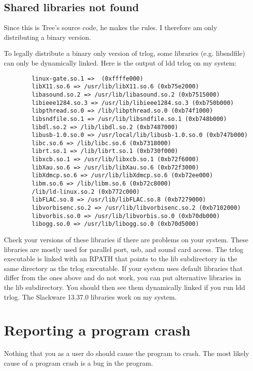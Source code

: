 \documentclass[12pt]{article}
\begin{document}
\subsection{Shared libraries not found}
Since this is Tree's source code, he makes the rules.
I therefore am only distributing a binary version.

To legally distribute a binary only version of trlog, some libraries
(e.g. libsndfile) can only be dynamically linked. Here is the output
of ldd trlog on my system:
\begin{verbatim}
        linux-gate.so.1 =>  (0xffffe000)
        libX11.so.6 => /usr/lib/libX11.so.6 (0xb75e2000)
        libasound.so.2 => /usr/lib/libasound.so.2 (0xb7515000)
        libieee1284.so.3 => /usr/lib/libieee1284.so.3 (0xb750b000)
        libpthread.so.0 => /lib/libpthread.so.0 (0xb74f1000)
        libsndfile.so.1 => /usr/lib/libsndfile.so.1 (0xb748b000)
        libdl.so.2 => /lib/libdl.so.2 (0xb7487000)
        libusb-1.0.so.0 => /usr/local/lib/libusb-1.0.so.0 (0xb747b000)
        libc.so.6 => /lib/libc.so.6 (0xb7318000)
        librt.so.1 => /lib/librt.so.1 (0xb730f000)
        libxcb.so.1 => /usr/lib/libxcb.so.1 (0xb72f6000)
        libXau.so.6 => /usr/lib/libXau.so.6 (0xb72f3000)
        libXdmcp.so.6 => /usr/lib/libXdmcp.so.6 (0xb72ee000)
        libm.so.6 => /lib/libm.so.6 (0xb72c8000)
        /lib/ld-linux.so.2 (0xb772c000)
        libFLAC.so.8 => /usr/lib/libFLAC.so.8 (0xb7279000)
        libvorbisenc.so.2 => /usr/lib/libvorbisenc.so.2 (0xb7102000)
        libvorbis.so.0 => /usr/lib/libvorbis.so.0 (0xb70db000)
        libogg.so.0 => /usr/lib/libogg.so.0 (0xb70d5000)
\end{verbatim}
Check your versions of these libraries if there are problems on your
system. These libraries are mostly
used for parallel port, usb, and sound card access.
The trlog executable is linked with an RPATH that points
to the lib subdirectory in the same directory as the trlog executable.
If your system uses default libraries that differ from the ones
above and do not work, you can put alternative libraries in the lib
subdirectory. You should then see them dynamically linked
if you run ldd trlog. The Slackware 13.37.0 libraries work on my
system.

\section{Reporting a program crash}
Nothing that you as a user do should cause the program to crash.
The most likely cause of a program crash is a bug in the program.
\end{document}
